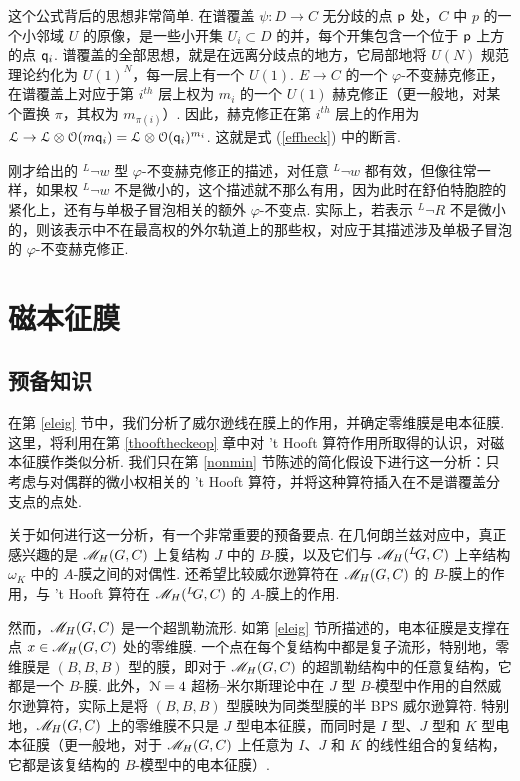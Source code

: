 这个公式背后的思想非常简单.
在谱覆盖 $\psi:D\to C$ 无分歧的点 ${\sf p}$ 处，$C$ 中 $p$ 的一个小邻域 $U$ 的原像，是一些小开集 $U_i\subset D$ 的并，每个开集包含一个位于 ${\sf p}$ 上方的点 ${\sf q}_i$.
谱覆盖的全部思想，就是在远离分歧点的地方，它局部地将 $U(N)$ 规范理论约化为 $U(1)^N$，每一层上有一个 $U(1)$.
$E\to C$ 的一个 $\varphi$-不变赫克修正，在谱覆盖上对应于第 $i^{th}$ 层上权为 $m_i$ 的一个 $U(1)$ 赫克修正（更一般地，对某个置换 $\pi$，其权为 $m_{\pi(i)}$）.
因此，赫克修正在第 $i^{th}$ 层上的作用为 ${\mathcal L}\to {\mathcal L}\otimes {\mathcal O}(m{\sf q}_i)
={\mathcal L}\otimes {\mathcal O}({\sf q}_i)^{m_i}$.
这就是式 (\ref{effheck}) 中的断言.


刚才给出的 $^L\neg w$ 型 $\varphi$-不变赫克修正的描述，对任意 $^L\neg w$ 都有效，但像往常一样，如果权 $^L\neg w$ 不是微小的，这个描述就不那么有用，因为此时在舒伯特胞腔的紧化上，还有与单极子冒泡相关的额外 $\varphi$-不变点.
实际上，若表示 $^L\neg R$ 不是微小的，则该表示中不在最高权的外尔轨道上的那些权，对应于其描述涉及单极子冒泡的 $\varphi$-不变赫克修正.


\section{磁本征膜}
\label{magbranes} 

\subsection{预备知识}\label{preliminaries}

在第 \ref{eleig} 节中，我们分析了威尔逊线在膜上的作用，并确定零维膜是电本征膜.
这里，将利用在第 \ref{thooftheckeop} 章中对 't Hooft 算符作用所取得的认识，对磁本征膜作类似分析.
我们只在第 \ref{nonmin} 节陈述的简化假设下进行这一分析：只考虑与对偶群的微小权相关的 't Hooft 算符，并将这种算符插入在不是谱覆盖分支点的点处.

关于如何进行这一分析，有一个非常重要的预备要点.
在几何朗兰兹对应中，真正感兴趣的是 ${{\mathscr{M}}_H}(G,C)$ 上复结构 $J$ 中的 $B$-膜，以及它们与 ${{\mathscr{M}}_H}(^L\negthinspace G,C)$ 上辛结构 $\omega_K$ 中的 $A$-膜之间的对偶性.
还希望比较威尔逊算符在 ${{\mathscr{M}}_H}(G,C)$ 的 $B$-膜上的作用，与 't Hooft 算符在 ${{\mathscr{M}}_H}(^L\negthinspace G,C)$ 的 $A$-膜上的作用.

然而，${{\mathscr{M}}_H}(G,C)$ 是一个超凯勒流形.
如第 \ref{eleig} 节所描述的，电本征膜是支撑在点 $x\in {{\mathscr{M}}_H}(G,C)$ 处的零维膜.
一个点在每个复结构中都是复子流形，特别地，零维膜是 $(B,B,B)$ 型的膜，即对于 ${{\mathscr{M}}_H}(G,C)$ 的超凯勒结构中的任意复结构，它都是一个 $B$-膜.
此外，${\cal N}=4$ 超杨--米尔斯理论中在 $J$ 型 $B$-模型中作用的自然威尔逊算符，实际上是将 $(B,B,B)$ 型膜映为同类型膜的半 BPS 威尔逊算符.
特别地，${{\mathscr{M}}_H}(G,C)$ 上的零维膜不只是 $J$ 型电本征膜，而同时是 $I$ 型、$J$ 型和 $K$ 型电本征膜（更一般地，对于 ${{\mathscr{M}}_H}(G,C)$ 上任意为 $I$、$J$ 和 $K$ 的线性组合的复结构，它都是该复结构的 $B$-模型中的电本征膜）.

